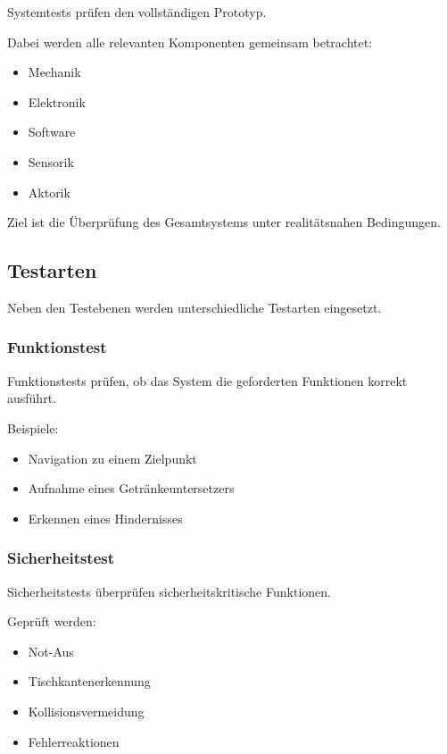 \documentclass[
  a4paper,
  12pt,
  DIV=12,        %
  parskip=half,  %
  headings=small %
]{scrartcl}
\theoremstyle{definition}
\providecommand{\tightlist}{%
  \setlength{\itemsep}{0pt}\setlength{\parskip}{0pt}}
\theoremstyle{definition}
\begin{document}
Systemtests prüfen den vollständigen Prototyp.

Dabei werden alle relevanten Komponenten gemeinsam betrachtet:

\begin{itemize}
\tightlist
\item
  Mechanik
\item
  Elektronik
\item
  Software
\item
  Sensorik
\item
  Aktorik
\end{itemize}

Ziel ist die Überprüfung des Gesamtsystems unter realitätsnahen
Bedingungen.

\subsection{Testarten}\label{testarten}

Neben den Testebenen werden unterschiedliche Testarten eingesetzt.

\subsubsection{Funktionstest}\label{funktionstest}

Funktionstests prüfen, ob das System die geforderten Funktionen korrekt
ausführt.

Beispiele:

\begin{itemize}
\tightlist
\item
  Navigation zu einem Zielpunkt
\item
  Aufnahme eines Getränkeuntersetzers
\item
  Erkennen eines Hindernisses
\end{itemize}

\subsubsection{Sicherheitstest}\label{sicherheitstest}

Sicherheitstests überprüfen sicherheitskritische Funktionen.

Geprüft werden:

\begin{itemize}
\tightlist
\item
  Not-Aus
\item
  Tischkantenerkennung
\item
  Kollisionsvermeidung
\item
  Fehlerreaktionen
\end{itemize}
\end{document}
